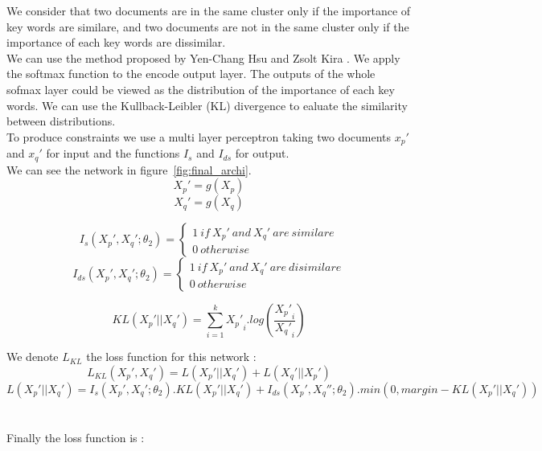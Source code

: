 \documentclass{article}
\begin{document}
We consider that two documents are in the same cluster only if the
importance of key words are similare, and two documents are not in the
same cluster only if the importance of each key words are dissimilar.
\\
We can use the method proposed by Yen-Chang Hsu and Zsolt Kira
\cite{2015arXiv151106321H}. We apply the softmax function to the
encode output layer. The outputs of the whole sofmax layer could be viewed as
the distribution of the importance of each key words. We can use the
Kullback-Leibler (KL) divergence to ealuate the similarity between
distributions.
\\
To produce constraints we use a multi layer perceptron taking two
documents $x_p'$ and $x_q'$ for input and the functions $I_s$ and
$I_{ds}$ for output.
\\
We can see the network in figure~\ref{fig:final_archi}.
\begin{equation}
  X_p' = g(X_p)
\end{equation}
\begin{equation}
  X_q' = g(X_q)
\end{equation}

\begin{equation}\label{eq:Is}
I_s(X_p', X_q'; \theta_2) = \left\{
    \begin{array}{ll}
        1~if~X_p'~and~X_q'~are~similare \\
        0~otherwise
    \end{array}
\right.
\end{equation}
\begin{equation}\label{eq:Ids}
I_{ds}(X_p', X_q'; \theta_2) = \left\{
    \begin{array}{ll}
        1~if~X_p'~and~X_q'~are~disimilare \\
        0~otherwise
    \end{array}
    \right.
\end{equation}

\begin{equation}\label{eq:KL}
KL(X_p' || X_q') = \sum_{i=1}^k {X_p'}_i . log(\frac{{X_p'}_i}{{X_q'}_i}) 
\end{equation}

We denote $L_{KL}$ the loss function for this network :
\begin{equation}\label{eq:LossKL}
L_{KL}(X_p', X_q') = L(X_p' || X_q') + L(X_q' || X_p') 
\end{equation}
\begin{equation}\label{eq:KLpq}
  L(X_p' || X_q') = I_s(X_p', X_q'; \theta_2) . KL(X_p' || X_q') +
  I_{ds}(X_p', X_q''; \theta_2) . min(0, margin - KL(X_p' || X_q'))
\end{equation}
\\ \\
Finally the loss function is :
\end{document}
